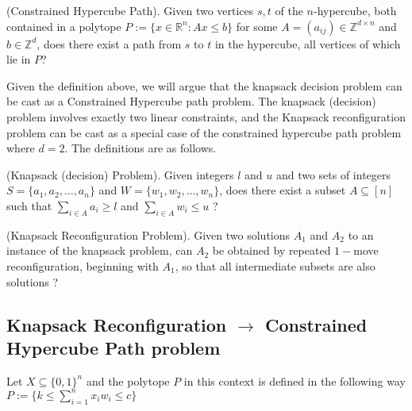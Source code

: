 \begin{defn}{(Constrained Hypercube Path).} Given two vertices $s, t$ of the $n$-hypercube, both contained in a polytope
$P := \{x \in \mathbb{R}^n : Ax \leq b\}$ for some $A = (a_{ij}) \in \mathbb{Z}^{d \times n}$ and $b \in \mathbb{Z}^d$, does there exist a path from $s$ to $t$
in the hypercube, all vertices of which lie in $P$?
\end{defn}

Given the definition above, we will argue that the knapsack decision problem can be cast as a Constrained Hypercube path problem.
The knapsack (decision) problem involves exactly two linear constraints, and the Knapsack reconfiguration problem can be cast as a special case of the
constrained hypercube path problem where $d = 2$. The definitions are as follows.
\begin{defn}{(Knapsack (decision) Problem).} Given integers $l$ and $u$ and two sets of integers $S = \{a_1, a_2,\dots, a_n\}$ and $W = \{w_1, w_2,\dots, w_n\}$,
does there exist a subset $A \subseteq [ n ]$ such that $\sum_{i \in A} a_i \geq l$ and $\sum_{i \in A} w_i \leq u$ ?
\end{defn}

\begin{defn}{(Knapsack Reconfiguration Problem).} Given two solutions $A_1$ and $A_2$ to an instance of the knapsack problem, can $A_2$ be obtained
by repeated $1-$move reconfiguration, beginning with $A_1$, so that all intermediate subsets are also solutions ?
\end{defn}

\subsection{Knapsack Reconfiguration $\rightarrow$ Constrained Hypercube Path problem }
Let $X \subseteq \{0,1\}^{n}$ and the polytope $P$ in this context is defined in the following way $P := \{k \leq \sum_{i=1}^{n} x_{i}w_{i} \leq c\}$

